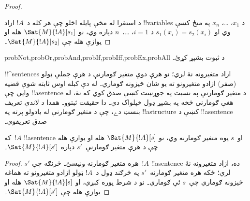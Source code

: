 \documentclass[../../../include/open-logic-section]{subfiles}
\begin{document}
\begin{proof}
\begin{enumerate}
\end{enumerate}
د استقرا له مخې پايله اخلو چې هر کله د~$!A$ ازاد !!{variable}s د
$x_1$، \dots، $x_n$ په منځ کښې وي او
$s_1(x_i)=s_2(x_i)$ د $i = 1$، \dots،~$n$ دپاره وي، نو
$\Sat{M}{!A}[s_1]$ هله او يوازې هله چې $\Sat{M}{!A}[s_2]$۔
\end{proof}

\begin{probtag}{probNot,probOr,probAnd,probIf,probIff,probEx,probAll}
د  ثبوت بشپړ کړئ۔
\end{probtag}

\begin{explain}
!!^{sentence}s ازاد متغيرونه نۀ لري؛ نو هرې دوې متغير ګومارنې د هرې
جملې ټولو (صفر) ازادو متغيرونو ته يو شان څيزونه ګوماري۔ له دې کبله
اوس ثابته شوې قضيه وايي چې !!a{sentence} د متغير ګومارنې په نسبت په
جوړښت کښې صدق کوي که نۀ، له هغې ګومارنې څخه په بشپړ ډول خپلواک دي۔
دا حقيقت ثبتوو۔ همدا د لاندې تعريف بنسټ دے، چې د متغير ګومارنې له
يادولو پرته په !!a{structure} کښې د !!a{sentence} صدق تعريفوي۔
\end{explain}

\begin{cor}
که~$!A$ !!a{sentence} او~$s$ يوه متغير ګومارنه وي، نو
$\Sat{M}{!A}[s]$ هله او يوازې هله چې د هرې متغير ګومارنې~$s'$ دپاره
$\Sat{M}{!A}[s']$۔
\end{cor}

\begin{proof}
  $s'$ هره متغير ګومارنه ونيسئ۔ څرنګه چې~$!A$ !!a{sentence} ده، ازاد
  متغيرونه نۀ لري؛ ځکه هره متغير ګومارنه~$s'$ په څرګند ډول د~$!A$
  ټولو ازادو متغيرونو ته هماغه څيزونه ګوماري چې~$s$ ئې ګوماري۔ نو د
   شرط پوره کېږي، او
  $\Sat{M}{!A}[s]$ هله او يوازې هله چې $\Sat{M}{!A}[s']$۔
\end{proof}
\end{document}
